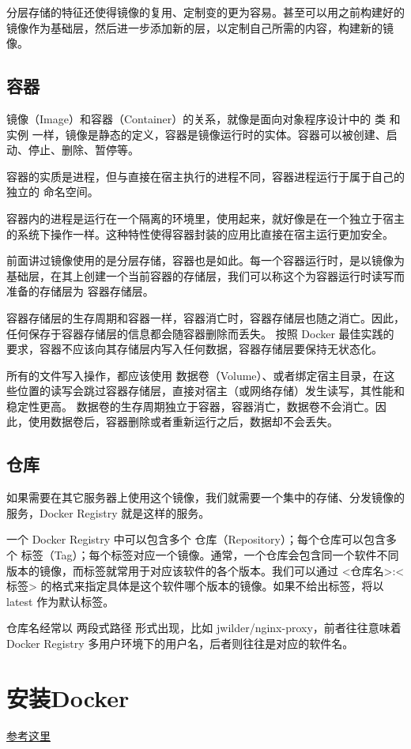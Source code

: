 \documentclass[UTF8]{ctexart}
\begin{document}
分层存储的特征还使得镜像的复用、定制变的更为容易。甚至可以用之前构建好的镜像作为基础层，然后进一步添加新的层，以定制自己所需的内容，构建新的镜像。

\subsection{容器}
镜像（Image）和容器（Container）的关系，就像是面向对象程序设计中的 类 和 实例 一样，镜像是静态的定义，容器是镜像运行时的实体。容器可以被创建、启动、停止、删除、暂停等。

容器的实质是进程，但与直接在宿主执行的进程不同，容器进程运行于属于自己的独立的 命名空间。

容器内的进程是运行在一个隔离的环境里，使用起来，就好像是在一个独立于宿主的系统下操作一样。这种特性使得容器封装的应用比直接在宿主运行更加安全。

前面讲过镜像使用的是分层存储，容器也是如此。每一个容器运行时，是以镜像为基础层，在其上创建一个当前容器的存储层，我们可以称这个为容器运行时读写而准备的存储层为 容器存储层。

容器存储层的生存周期和容器一样，容器消亡时，容器存储层也随之消亡。因此，任何保存于容器存储层的信息都会随容器删除而丢失。
按照 Docker 最佳实践的要求，容器不应该向其存储层内写入任何数据，容器存储层要保持无状态化。

所有的文件写入操作，都应该使用 数据卷（Volume）、或者绑定宿主目录，在这些位置的读写会跳过容器存储层，直接对宿主（或网络存储）发生读写，其性能和稳定性更高。
数据卷的生存周期独立于容器，容器消亡，数据卷不会消亡。因此，使用数据卷后，容器删除或者重新运行之后，数据却不会丢失。

\subsection{仓库}
如果需要在其它服务器上使用这个镜像，我们就需要一个集中的存储、分发镜像的服务，Docker Registry 就是这样的服务。

一个 Docker Registry 中可以包含多个 仓库（Repository）；每个仓库可以包含多个 标签（Tag）；每个标签对应一个镜像。通常，一个仓库会包含同一个软件不同版本的镜像，而标签就常用于对应该软件的各个版本。我们可以通过 <仓库名>:<标签> 的格式来指定具体是这个软件哪个版本的镜像。如果不给出标签，将以 latest 作为默认标签。

仓库名经常以 两段式路径 形式出现，比如 jwilder/nginx-proxy，前者往往意味着 Docker Registry 多用户环境下的用户名，后者则往往是对应的软件名。

\section{安装Docker}
\href{https://yeasy.gitbook.io/docker_practice/install/mac}{参考这里}
\end{document}
